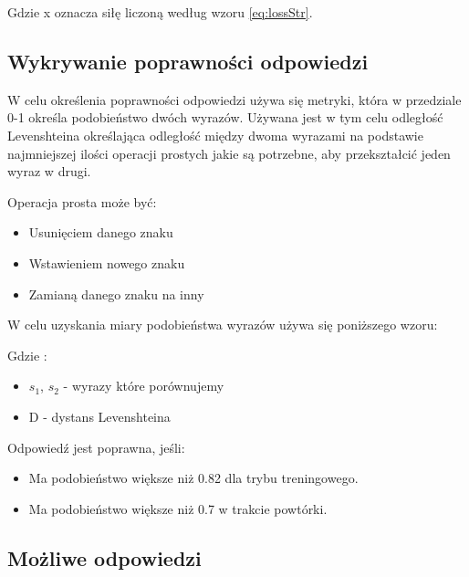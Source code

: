 Gdzie x oznacza siłę liczoną według wzoru \ref{eq:lossStr}.

\subsection{Wykrywanie poprawności odpowiedzi}

W celu określenia poprawności odpowiedzi używa się metryki, która w przedziale 0-1 określa podobieństwo dwóch wyrazów. Używana jest w tym celu odległość Levenshteina określająca odległość między dwoma wyrazami na podstawie najmniejszej ilości operacji prostych jakie są potrzebne, aby przekształcić jeden wyraz w drugi. \cite{Leve}

Operacja prosta może być:
\begin{itemize}
	\item Usunięciem danego znaku
	\item Wstawieniem nowego znaku
	\item Zamianą danego znaku na inny
\end{itemize}

W celu uzyskania miary podobieństwa wyrazów używa się poniższego wzoru: 


Gdzie :
\begin{itemize} 
	\item $s_1$, $s_2$ - wyrazy które porównujemy
	\item D - dystans Levenshteina
\end{itemize}

\vspace{1cm}

Odpowiedź jest poprawna, jeśli:
\begin{itemize}
	\item Ma podobieństwo większe niż 0.82 dla trybu treningowego.
	\item Ma podobieństwo większe niż 0.7 w trakcie powtórki.
\end{itemize}

\subsection{Możliwe odpowiedzi}

